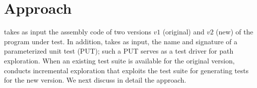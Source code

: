 \vspace{-2ex}
\section{Approach}
\label{sec:approach}
\vspace{-2ex}
 takes as input the assembly code of two versions $v1$ (original) and $v2$ (new) of the program under test. In addition,  takes as input, the name and signature of a parameterized unit test (PUT); such a PUT serves as a test driver for path exploration. 
When an existing test suite is available for the original version,  conducts incremental exploration that exploits the test suite for generating tests for the new version. We next discuss in detail the  approach. 



\vspace{-2ex}

